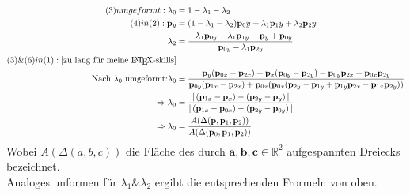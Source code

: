 \documentclass[fontsize=10pt,a4paper]{scrartcl}
\begin{document}
\begin{align}
(3) umgeformt:\space \lambda_0&=1-\lambda_1-\lambda_2\\
(4) in (2):\mathbf{p}_y&=\space (1-\lambda_1-\lambda_2)\mathbf{p}_0y+\lambda_1\mathbf{p}_1y+\lambda_2\mathbf{p}_2y\\
\lambda_2&=\frac{-\lambda_1\mathbf{p}_{0y}+\lambda_1\mathbf{p}_{1y}-\mathbf{p}_{y}+\mathbf{p}_{0y}}{\mathbf{p}_{0y}-\lambda_1\mathbf{p}_{2y}}\\
(3)\&(6)in(1): \textnormal{[zu lang für meine \LaTeX-skills]}\\
\textnormal{Nach }\lambda_0\textnormal{ umgeformt:}\lambda_0&=\frac{\mathbf{p}_y(\mathbf{p}_{0x}-\mathbf{p}_{2x})+\mathbf{p}_{x}(\mathbf{p}_{0y}-\mathbf{p}_{2y})
	-\mathbf{p}_{0y}\mathbf{p}_{2x}+\mathbf{p}_{0x}\mathbf{p}_{2y}}{\mathbf{p}_{0y}(\mathbf{p}_{1x}-\mathbf{p}_{2x})+\mathbf{p}_{0x}(\mathbf{p}_{0x}(\mathbf{p}_{2y}-\mathbf{p}_{1y}+\mathbf{p}_{1y}\mathbf{p}_{2x}-\mathbf{p}_{1x}\mathbf{p}_{2y}))}\\
	\Rightarrow \lambda_0 & =\frac{\vert\left(\mathbf{p}_{1x}-\mathbf{p}_{x}\right)-\left(\mathbf{p}_{2y}-\mathbf{p}_{y}\right)\vert}{\vert\left(\mathbf{p}_{1x}-\mathbf{p}_{0x}\right)-\left(\mathbf{p}_{2y}-\mathbf{p}_{0y}\right)\vert} \\
	\Rightarrow \lambda_0 & =\frac{A(\Delta(\mathbf{p},\mathbf{p}_1,\mathbf{p}_2))}{A(\Delta(\mathbf{p}_0,\mathbf{p}_1,\mathbf{p}_2))} \\
\end{align}
Wobei $A(\Delta(a,b,c))$ die Fläche des durch $\mathbf{a},\mathbf{b},\mathbf{c}\in\mathbb{R}^2$ aufgespannten Dreiecks bezeichnet.\\
Analoges unformen für $\lambda_1$\&$\lambda_2$ ergibt die entsprechenden Frormeln von oben.
\end{document}
